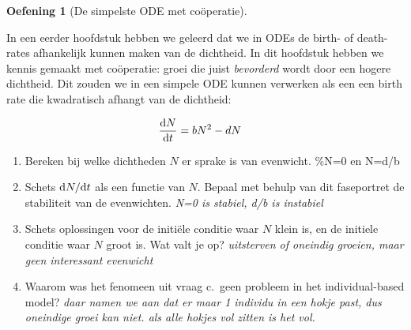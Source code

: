 \documentclass[
  a4paper,
]{scrbook}
\providecommand{\tightlist}{%
  \setlength{\itemsep}{0pt}\setlength{\parskip}{0pt}}\usepackage{longtable,booktabs,array}
\theoremstyle{definition}
\newtheorem{exercise}{Oefening}[chapter]
\theoremstyle{remark}
\begin{document}
\begin{exercise}[De simpelste ODE met
coöperatie]\protect\hypertarget{exr-desimpelstecoop}{}\label{exr-desimpelstecoop}

In een eerder hoofdstuk hebben we geleerd dat we in ODEs de birth- of
death-rates afhankelijk kunnen maken van de dichtheid. In dit hoofdstuk
hebben we kennis gemaakt met coöperatie: groei die juist
\emph{bevorderd} wordt door een hogere dichtheid. Dit zouden we in een
simpele ODE kunnen verwerken als een een birth rate die kwadratisch
afhangt van de dichtheid:

\begin{align}
    \mathchoice{\frac{\mathrm{d}N}
{\mathrm{d}t}}{\mathrm{d}N/\mathrm{d}t}
{\mathrm{d}N/\mathrm{d}t}
{\mathrm{d}N/\mathrm{d}t} &= bN^2 - dN
\end{align}

\begin{enumerate}
\def\labelenumi{\alph{enumi}.}
\tightlist
\item
  Bereken bij welke dichtheden \(N\) er sprake is van evenwicht. \%N=0
  en N=d/b
\item
  Schets \(\mathchoice{\frac{\mathrm{d}N}
  {\mathrm{d}t}}{\mathrm{d}N/\mathrm{d}t}
  {\mathrm{d}N/\mathrm{d}t}
  {\mathrm{d}N/\mathrm{d}t}\) als een functie van \(N\). Bepaal met
  behulp van dit faseportret de stabiliteit van de evenwichten.
  \emph{N=0 is stabiel, d/b is instabiel}
\item
  Schets oplossingen voor de initiële conditie waar \(N\) klein is, en
  de initiele conditie waar \(N\) groot is. Wat valt je op?
  \emph{uitsterven of oneindig groeien, maar geen interessant evenwicht}
\item
  Waarom was het fenomeen uit vraag c.~geen probleem in het
  individual-based model? \emph{daar namen we aan dat er maar 1 individu
  in een hokje past, dus oneindige groei kan niet. als alle hokjes vol
  zitten is het vol.~}
\end{enumerate}

\end{exercise}
\end{document}
